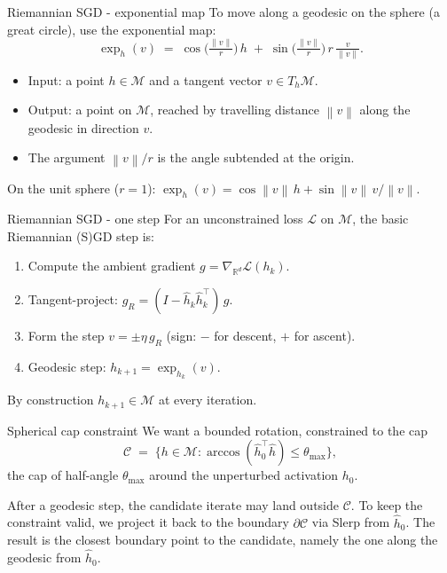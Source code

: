 \documentclass[10pt,aspectratio=169]{beamer}
\newcommand{\R}{\mathbb{R}}
\newcommand{\hh}{\hat h}
\newcommand{\thmax}{\theta_{\max}}
\newcommand{\norm}[1]{\left\lVert#1\right\rVert}
\begin{document}
\begin{frame}{Riemannian SGD - exponential map}
To move along a geodesic on the sphere (a great circle), use the exponential map:
\[
\exp_h(v) \;=\; \cos\!\Big(\tfrac{\norm{v}}{r}\Big)\,h \;+\; \sin\!\Big(\tfrac{\norm{v}}{r}\Big)\,r\,\tfrac{v}{\norm{v}}.
\]
\begin{itemize}
\item Input: a point $h \in \mathcal{M}$ and a tangent vector $v \in T_h\mathcal{M}$.
\item Output: a point on $\mathcal{M}$, reached by travelling distance $\norm{v}$ along the geodesic in direction $v$.
\item The argument $\norm{v}/r$ is the angle subtended at the origin.
\end{itemize}
On the unit sphere ($r=1$): $\exp_h(v) = \cos\norm{v}\,h + \sin\norm{v}\,v/\norm{v}$.
\end{frame}

\begin{frame}{Riemannian SGD - one step}
For an unconstrained loss $\mathcal{L}$ on $\mathcal{M}$, the basic Riemannian (S)GD step is:
\begin{enumerate}
\item Compute the ambient gradient $g = \nabla_{\R^d}\mathcal{L}(h_k)$.
\item Tangent-project: $g_R = (I - \hh_k\hh_k^\top)\,g$.
\item Form the step $v = \pm\eta\,g_R$ (sign: $-$ for descent, $+$ for ascent).
\item Geodesic step: $h_{k+1} = \exp_{h_k}(v)$.
\end{enumerate}

\bigskip
By construction $h_{k+1} \in \mathcal{M}$ at every iteration.
\end{frame}

\begin{frame}{Spherical cap constraint}
We want a bounded rotation, constrained to the cap
\[
\mathcal{C} \;=\; \big\{ h \in \mathcal{M} : \arccos(\hh_0^\top \hh) \le \thmax \big\},
\]
the cap of half-angle $\thmax$ around the unperturbed activation $h_0$.

\smallskip
After a geodesic step, the candidate iterate may land outside $\mathcal{C}$. To keep the constraint valid, we project it back to the boundary $\partial\mathcal{C}$ via Slerp from $\hh_0$. The result is the closest boundary point to the candidate, namely the one along the geodesic from $\hh_0$.
\end{frame}
\end{document}
